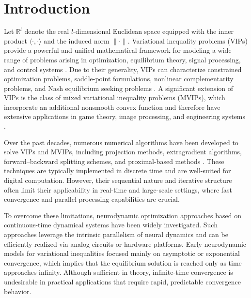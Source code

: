 \documentclass{article}
\theoremstyle{plain}%
\theoremstyle{thmstyletwo}%
\theoremstyle{thmstylethree}%
\begin{document}
\section{Introduction}\label{p3sec1}
Let $\mathbb{R}^l$ denote the real $l$-dimensional Euclidean space equipped with the inner product 
$\langle \cdot , \cdot \rangle$ and the induced norm $\|\cdot\|$. Variational inequality problems (VIPs) provide a powerful and unified mathematical framework for modeling a wide range of problems arising in optimization, equilibrium theory, signal processing, and control systems \cite{Facchinei03,Kinderlehrer00, Scutari10,Konnov12, Neittaanmaki88}. Due to their generality, VIPs can characterize constrained optimization problems, saddle-point formulations, nonlinear complementarity problems, and Nash equilibrium seeking problems \cite{Scutari10, JuX25, Korpelevich, Cavazzuti02}. A significant extension of VIPs is the class of mixed variational inequality problems (MVIPs), which incorporate an additional nonsmooth convex function and therefore have extensive applications in game theory, image processing, and engineering systems \cite{Zheng24,JuX21Neuro}.

Over the past decades, numerous numerical algorithms have been developed to solve VIPs and MVIPs, including projection methods, extragradient algorithms, forward--backward splitting schemes, and proximal-based methods \cite{Parikh14,Censor1,Tseng, Thong18, JuX21exp, Pham17, Malitsky20, Vuong20}. These techniques are typically implemented in discrete time and are well-suited for digital computation. However, their sequential nature and iterative structure often limit their applicability in real-time and large-scale settings, where fast convergence and parallel processing capabilities are crucial.

 To overcome these limitations, neurodynamic optimization approaches based on continuous-time dynamical systems have been widely investigated. Such approaches leverage the intrinsic parallelism of neural dynamics and can be efficiently realized via analog circuits or hardware platforms. Early neurodynamic models for variational inequalities focused mainly on asymptotic or exponential convergence, which implies that the equilibrium solution is reached only as time approaches infinity. Although sufficient in theory, infinite-time convergence is undesirable in practical applications that require rapid, predictable convergence behavior.
\end{document}
